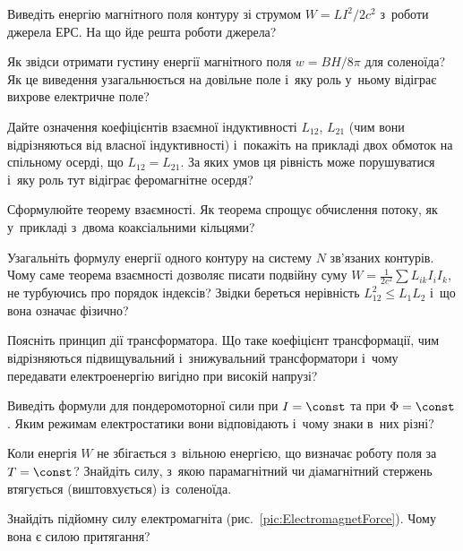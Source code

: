 \begin{Questions}
	\begin{quizlist}
		\item Виведіть енергію магнітного поля контуру зі струмом $W = LI^2/2c^2$ з~роботи
		  джерела ЕРС. На що йде решта роботи джерела?
		\item Як звідси отримати густину енергії магнітного поля $w = BH/8\pi$ для
		  соленоїда? Як це виведення узагальнюється на довільне поле і~яку роль у~ньому
		  відіграє вихрове електричне поле?
		\item Дайте означення коефіцієнтів взаємної індуктивності $L_{12}$, $L_{21}$ (чим
		  вони відрізняються від власної індуктивності) і~покажіть на прикладі двох
		  обмоток на спільному осерді, що $L_{12}=L_{21}$. За яких умов ця рівність може
		  порушуватися і~яку роль тут відіграє феромагнітне осердя?
		\item Сформулюйте теорему взаємності. Як теорема спрощує обчислення потоку, як
		  у~прикладі з~двома коаксіальними кільцями?
		\item Узагальніть формулу енергії одного контуру на систему $N$ зв'язаних
		  контурів. Чому саме теорема взаємності дозволяє писати подвійну суму
		  $W=\frac1{2c^2}\sum L_{ik}I_iI_k$, не турбуючись про порядок індексів? Звідки
		  береться нерівність $L_{12}^2\le L_1L_2$ і~що вона означає фізично?
		\item Поясніть принцип дії трансформатора. Що таке коефіцієнт трансформації, чим
		  відрізняються підвищувальний і~знижувальний трансформатори і~чому передавати
		  електроенергію вигідно при високій напрузі?
		\item Виведіть формули для пондеромоторної сили при $I=\const$ та при
		  $\Phi=\const$. Яким режимам електростатики вони відповідають і~чому знаки в~них різні?
		\item Коли енергія $W$ не збігається з~вільною енергією, що визначає роботу поля за $T=\const$? Знайдіть силу,
		  з~якою парамагнітний чи діамагнітний стержень втягується (виштовхується) із~соленоїда.
		\item Знайдіть підйомну силу електромагніта (рис.~\ref{pic:ElectromagnetForce}).
		  Чому вона є силою притягання?
	\end{quizlist}
\end{Questions}

